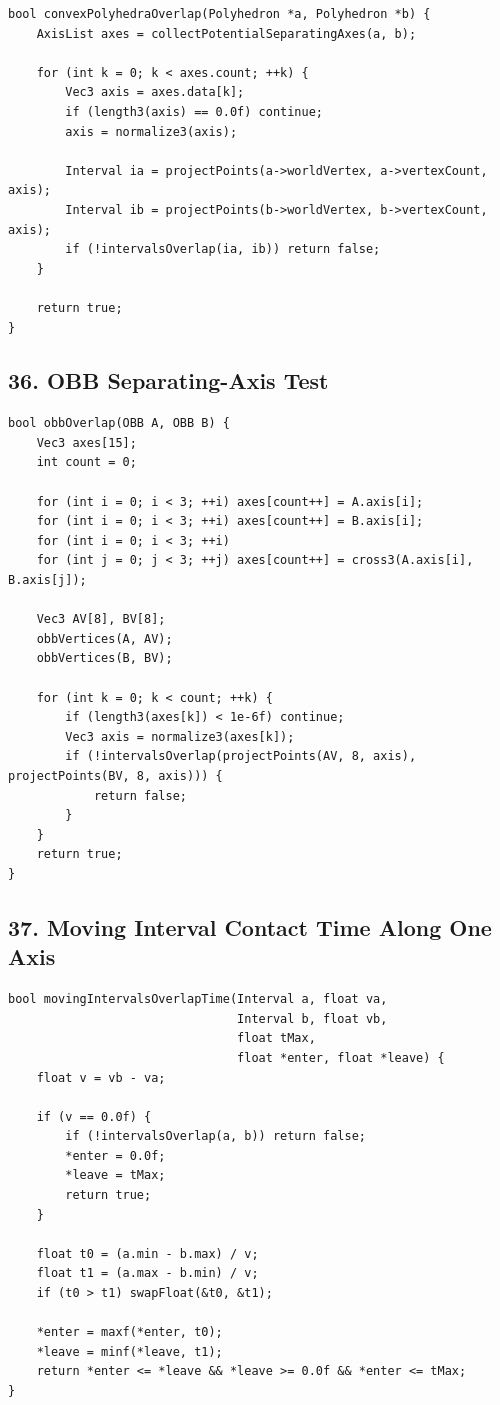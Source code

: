 \documentclass[10pt,letterpaper]{article}
\begin{document}
\begin{verbatim}
bool convexPolyhedraOverlap(Polyhedron *a, Polyhedron *b) {
    AxisList axes = collectPotentialSeparatingAxes(a, b);

    for (int k = 0; k < axes.count; ++k) {
        Vec3 axis = axes.data[k];
        if (length3(axis) == 0.0f) continue;
        axis = normalize3(axis);

        Interval ia = projectPoints(a->worldVertex, a->vertexCount, axis);
        Interval ib = projectPoints(b->worldVertex, b->vertexCount, axis);
        if (!intervalsOverlap(ia, ib)) return false;
    }

    return true;
}
\end{verbatim}

\subsection*{36. OBB Separating-Axis Test}

\begin{verbatim}
bool obbOverlap(OBB A, OBB B) {
    Vec3 axes[15];
    int count = 0;

    for (int i = 0; i < 3; ++i) axes[count++] = A.axis[i];
    for (int i = 0; i < 3; ++i) axes[count++] = B.axis[i];
    for (int i = 0; i < 3; ++i)
    for (int j = 0; j < 3; ++j) axes[count++] = cross3(A.axis[i], B.axis[j]);

    Vec3 AV[8], BV[8];
    obbVertices(A, AV);
    obbVertices(B, BV);

    for (int k = 0; k < count; ++k) {
        if (length3(axes[k]) < 1e-6f) continue;
        Vec3 axis = normalize3(axes[k]);
        if (!intervalsOverlap(projectPoints(AV, 8, axis), projectPoints(BV, 8, axis))) {
            return false;
        }
    }
    return true;
}
\end{verbatim}

\subsection*{37. Moving Interval Contact Time Along One Axis}

\begin{verbatim}
bool movingIntervalsOverlapTime(Interval a, float va,
                                Interval b, float vb,
                                float tMax,
                                float *enter, float *leave) {
    float v = vb - va;

    if (v == 0.0f) {
        if (!intervalsOverlap(a, b)) return false;
        *enter = 0.0f;
        *leave = tMax;
        return true;
    }

    float t0 = (a.min - b.max) / v;
    float t1 = (a.max - b.min) / v;
    if (t0 > t1) swapFloat(&t0, &t1);

    *enter = maxf(*enter, t0);
    *leave = minf(*leave, t1);
    return *enter <= *leave && *leave >= 0.0f && *enter <= tMax;
}
\end{verbatim}
\end{document}
